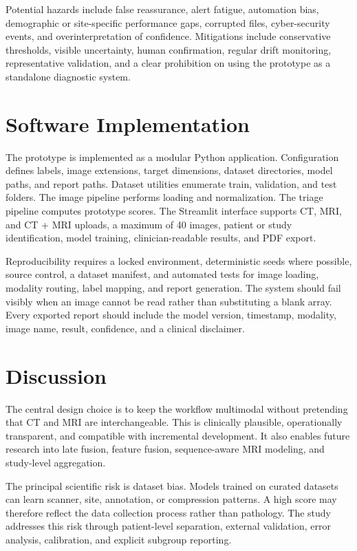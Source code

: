 \documentclass[10pt,a4paper]{article}
\begin{document}
Potential hazards include false reassurance, alert fatigue, automation bias, demographic or site-specific performance gaps, corrupted files, cyber-security events, and overinterpretation of confidence. Mitigations include conservative thresholds, visible uncertainty, human confirmation, regular drift monitoring, representative validation, and a clear prohibition on using the prototype as a standalone diagnostic system.

\section{Software Implementation}
The prototype is implemented as a modular Python application. Configuration defines labels, image extensions, target dimensions, dataset directories, model paths, and report paths. Dataset utilities enumerate train, validation, and test folders. The image pipeline performs loading and normalization. The triage pipeline computes prototype scores. The Streamlit interface supports CT, MRI, and CT + MRI uploads, a maximum of 40 images, patient or study identification, model training, clinician-readable results, and PDF export.

Reproducibility requires a locked environment, deterministic seeds where possible, source control, a dataset manifest, and automated tests for image loading, modality routing, label mapping, and report generation. The system should fail visibly when an image cannot be read rather than substituting a blank array. Every exported report should include the model version, timestamp, modality, image name, result, confidence, and a clinical disclaimer.

\section{Discussion}
The central design choice is to keep the workflow multimodal without pretending that CT and MRI are interchangeable. This is clinically plausible, operationally transparent, and compatible with incremental development. It also enables future research into late fusion, feature fusion, sequence-aware MRI modeling, and study-level aggregation.

The principal scientific risk is dataset bias. Models trained on curated datasets can learn scanner, site, annotation, or compression patterns. A high score may therefore reflect the data collection process rather than pathology. The study addresses this risk through patient-level separation, external validation, error analysis, calibration, and explicit subgroup reporting.
\end{document}
